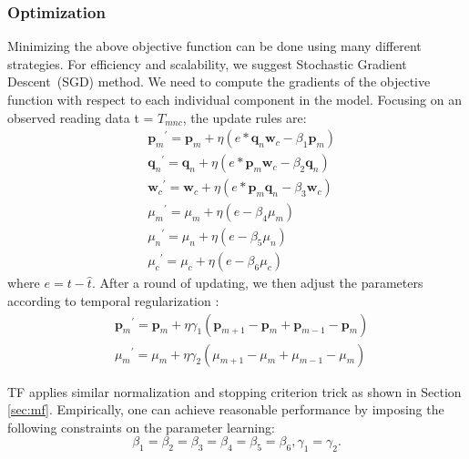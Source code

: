 \subsubsection{Optimization}
Minimizing the above objective function can be done using many different strategies.
For efficiency and scalability, we suggest Stochastic Gradient Descent~(SGD) method.
We need to compute the gradients of the objective function with respect to each individual component in the model.
Focusing on an observed reading data t = $T_{mnc} $, the update rules are:
\begin{equation*}
\begin{aligned}
&{\mathbf{p}_m}^\prime={\mathbf{p}_m}+\eta(e*\mathbf{q}_n \mathbf{w}_c - \beta_1 \mathbf{p}_m)
\\&{\mathbf{q}_n}^\prime={\mathbf{q}_n}+\eta(e*\mathbf{p}_m \mathbf{w}_c - \beta_2 \mathbf{q}_n)
\\&{\mathbf{w}_c}^\prime={\mathbf{w}_c}+\eta(e*\mathbf{p}_m \mathbf{q}_n - \beta_3 \mathbf{w}_c)
\\&{\mu_m}^\prime=\mu_m+\eta(e-\beta_4\mu_m)
\\&{\mu_n}^\prime=\mu_n+\eta(e-\beta_5\mu_n)
\\&{\mu_c}^\prime=\mu_c+\eta(e-\beta_6\mu_c)
\end{aligned}
\end{equation*}
where $e=t-\hat{t}$. After a round of updating, we then adjust the parameters according to temporal regularization :
\begin{equation*}
\begin{aligned}
&{\mathbf{p}_m}^\prime={\mathbf{p}_m}+\eta\gamma_1(\mathbf{p}_{m+1}-\mathbf{p}_m+\mathbf{p}_{m-1}-\mathbf{p}_m)
\\&{\mu_m}^\prime=\mu_m+\eta\gamma_2(\mu_{m+1}-\mu_m+\mu_{m-1}-\mu_m)
\end{aligned}
\end{equation*}

TF applies similar normalization and stopping criterion trick as shown in Section \ref{sec:mf}.
Empirically, one can achieve reasonable performance by imposing the following constraints on the parameter learning:  
\begin{equation*}
\beta_1=\beta_2=\beta_3=\beta_4=\beta_5=\beta_6, \gamma_1=\gamma_2.
\end{equation*}
